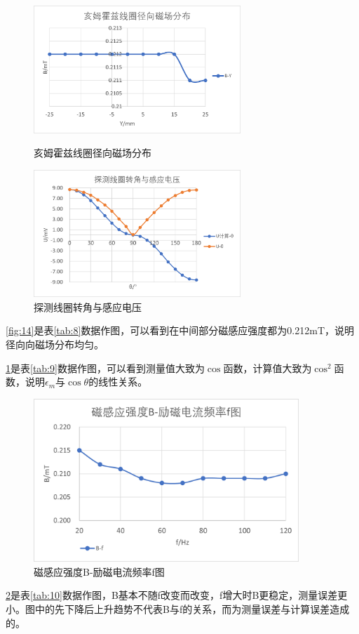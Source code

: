 \documentclass[11pt]{article}
\begin{document}
\begin{figure}[H]
    \centering
    \begin{minipage}[t]{0.49\linewidth}
        \centering
        \includegraphics[width=7.8cm]{Fig/14.png}
        \caption{亥姆霍兹线圈径向磁场分布}
        \label{fig:14}
    \end{minipage}
    \begin{minipage}[t]{0.49\linewidth}
        \centering
        \includegraphics[width=7.8cm]{Fig/15.png}
        \caption{探测线圈转角与感应电压}
        \label{fig:15}
    \end{minipage}
\end{figure}
\par \cref{fig:14}是表\ref{tab:8}数据作图，可以看到在中间部分磁感应强度都为0.212mT，说明径向向磁场分布均匀。
\par \cref{fig:15}是表\ref{tab:9}数据作图，可以看到测量值大致为$\cos$函数，计算值大致为${\cos}^2$函数，说明$\epsilon_m$与$\cos\theta$的线性关系。
\begin{figure}[H]
    \centering
    \includegraphics[width=10cm]{Fig/16.png}
    \caption{磁感应强度B-励磁电流频率f图}
    \label{fig:16}
\end{figure}
\par \cref{fig:16}是表\ref{tab:10}数据作图，B基本不随f改变而改变，f增大时B更稳定，测量误差更小。图中的先下降后上升趋势不代表B与f的关系，而为测量误差与计算误差造成的。
\end{document}
